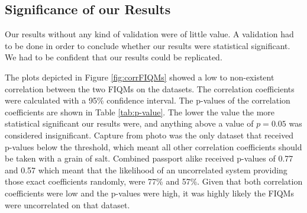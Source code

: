 \subsection{Significance of our Results}
Our results without any kind of validation were of little value. A validation had to be done in order to conclude whether our results were statistical significant. We had to be confident that our results could be replicated. 

The plots depicted in Figure \ref{fig:corrFIQMs} showed a low to non-existent correlation between the two FIQMs on the datasets. The correlation coefficients were calculated with a 95\% confidence interval. The p-values of the correlation coefficients are shown in Table \ref{tab:p-value}. The lower the value the more statistical significant our results were, and anything above a value of $p = 0.05$ was considered insignificant. Capture from photo was the only dataset that received p-values below the threshold, which meant all other correlation coefficients should be taken with a grain of salt. Combined passport alike received p-values of 0.77 and 0.57 which meant that the likelihood of an uncorrelated system providing those exact coefficients randomly, were 77\% and 57\%. Given that both correlation coefficients were low and the p-values were high, it was highly likely the FIQMs were uncorrelated on that dataset. 
\newpage

\begin{table}[h] 
\caption{The p-values of the correlation coefficients between ISO Metrics and FaceQnet. The values indicated the probability of an uncorrelated system providing the same correlation coefficients.}
\label{tab:p-value}
\end{table}

